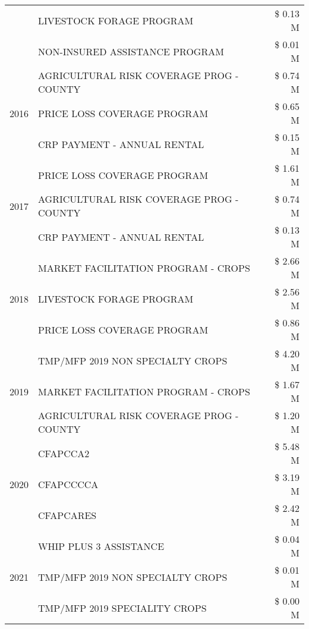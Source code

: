 \begin{tabular}{llr}
 & LIVESTOCK FORAGE PROGRAM & \$ 0.13 M \\
 & NON-INSURED ASSISTANCE PROGRAM & \$ 0.01 M \\
\cline{1-3}
\multirow[t]{3}{*}{2016} & AGRICULTURAL RISK COVERAGE PROG - COUNTY & \$ 0.74 M \\
 & PRICE LOSS COVERAGE PROGRAM & \$ 0.65 M \\
 & CRP PAYMENT - ANNUAL RENTAL & \$ 0.15 M \\
\cline{1-3}
\multirow[t]{3}{*}{2017} & PRICE LOSS COVERAGE PROGRAM & \$ 1.61 M \\
 & AGRICULTURAL RISK COVERAGE PROG - COUNTY & \$ 0.74 M \\
 & CRP PAYMENT - ANNUAL RENTAL & \$ 0.13 M \\
\cline{1-3}
\multirow[t]{3}{*}{2018} & MARKET FACILITATION PROGRAM - CROPS & \$ 2.66 M \\
 & LIVESTOCK FORAGE PROGRAM & \$ 2.56 M \\
 & PRICE LOSS COVERAGE PROGRAM & \$ 0.86 M \\
\cline{1-3}
\multirow[t]{3}{*}{2019} & TMP/MFP 2019 NON SPECIALTY CROPS & \$ 4.20 M \\
 & MARKET FACILITATION PROGRAM - CROPS & \$ 1.67 M \\
 & AGRICULTURAL RISK COVERAGE PROG - COUNTY & \$ 1.20 M \\
\cline{1-3}
\multirow[t]{3}{*}{2020} & CFAPCCA2 & \$ 5.48 M \\
 & CFAPCCCCA & \$ 3.19 M \\
 & CFAPCARES & \$ 2.42 M \\
\cline{1-3}
\multirow[t]{3}{*}{2021} & WHIP PLUS 3 ASSISTANCE & \$ 0.04 M \\
 & TMP/MFP 2019 NON SPECIALTY CROPS & \$ 0.01 M \\
 & TMP/MFP 2019 SPECIALITY CROPS & \$ 0.00 M \\
\cline{1-3}
\bottomrule
\end{tabular}

